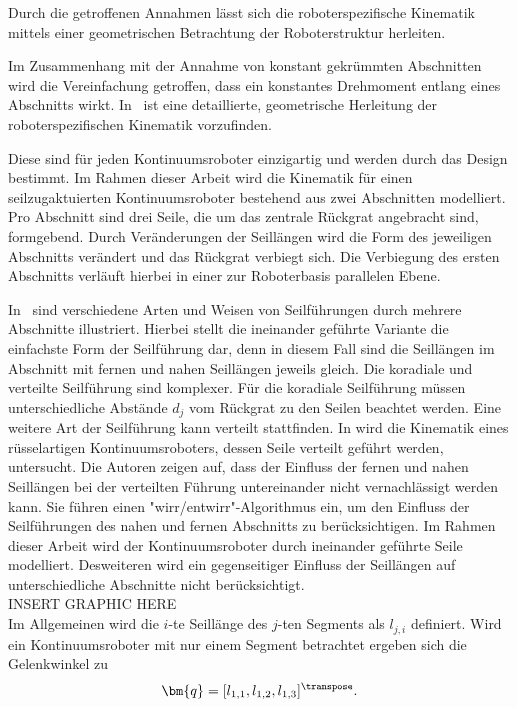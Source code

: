 Durch die getroffenen Annahmen lässt sich die roboterspezifische Kinematik mittels einer geometrischen Betrachtung der Roboterstruktur herleiten. 

Im Zusammenhang mit der Annahme von konstant gekrümmten Abschnitten wird die Vereinfachung getroffen, dass ein konstantes Drehmoment entlang eines Abschnitts wirkt. In~\cite{JW06} ist eine detaillierte, geometrische Herleitung der roboterspezifischen Kinematik vorzufinden. 

Diese sind für jeden Kontinuumsroboter einzigartig und werden durch das Design bestimmt. Im Rahmen dieser Arbeit wird die Kinematik für einen seilzugaktuierten Kontinuumsroboter bestehend aus zwei Abschnitten modelliert. Pro Abschnitt sind drei Seile, die um das zentrale Rückgrat angebracht sind, formgebend. Durch Veränderungen der Seillängen wird die Form des jeweiligen Abschnitts verändert und das Rückgrat verbiegt sich. Die Verbiegung des ersten Abschnitts verläuft hierbei in einer zur Roboterbasis parallelen Ebene. 

In~ sind verschiedene Arten und Weisen von Seilführungen durch mehrere Abschnitte illustriert. Hierbei stellt die ineinander geführte Variante die einfachste Form der Seilführung dar, denn in diesem Fall sind die Seillängen im Abschnitt mit fernen und nahen Seillängen jeweils gleich. Die koradiale und verteilte Seilführung sind komplexer. Für die koradiale Seilführung müssen unterschiedliche Abstände $d_j$ vom Rückgrat zu den Seilen beachtet werden. Eine weitere Art der Seilführung kann verteilt stattfinden. In \cite{JW06a} wird die Kinematik eines rüsselartigen Kontinuumsroboters, dessen Seile verteilt geführt werden, untersucht. Die Autoren zeigen auf, dass der Einfluss der fernen und nahen Seillängen bei der verteilten Führung untereinander nicht vernachlässigt werden kann. Sie führen einen "wirr/entwirr"-Algorithmus ein, um den Einfluss der Seilführungen des nahen und fernen Abschnitts zu berücksichtigen. Im Rahmen dieser Arbeit wird der Kontinuumsroboter durch ineinander geführte Seile modelliert. Desweiteren wird ein gegenseitiger Einfluss der Seillängen auf unterschiedliche Abschnitte nicht berücksichtigt. \\

INSERT GRAPHIC HERE \\

Im Allgemeinen wird die $i$-te Seillänge des $j$-ten Segments als $l_{j,i}$ definiert. Wird ein Kontinuumsroboter mit nur einem Segment betrachtet ergeben sich die Gelenkwinkel zu
%
\begin{align*}
\bm{q} = [l_{1,1}, l_{1,2}, l_{1,3}]^\transpose.
\end{align*}



